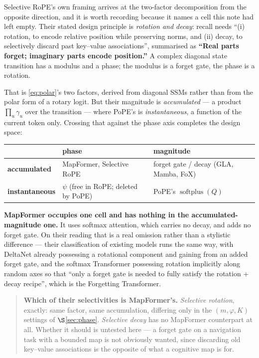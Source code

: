 \documentclass[11pt]{article}
\DeclareMathOperator{\softplus}{softplus}
\begin{document}
Selective RoPE's own framing arrives at the two-factor decomposition from the
opposite direction, and it is worth recording because it names a cell this note
had left empty. Their stated design principle is \emph{rotation and decay}:
recall needs ``(i) rotation, to encode relative position while preserving norms,
and (ii) decay, to selectively discard past key--value associations'', summarised
as \textbf{``Real parts forget; imaginary parts encode position.''} A complex
diagonal state transition has a modulus and a phase; the modulus is a forget
gate, the phase is a rotation.

That is \eqref{eq:polar}'s two factors, derived from diagonal SSMs rather than
from the polar form of a rotary logit. But their magnitude is \emph{accumulated}
--- a product $\prod_{u}\gamma_u$ over the transition --- where PoPE's is
\emph{instantaneous}, a function of the current token only. Crossing that against
the phase axis completes the design space:

\begin{center}\small
\begin{tabular}{lll}
\toprule
 & \textbf{phase} & \textbf{magnitude} \\
\midrule
\textbf{accumulated} & MapFormer, Selective RoPE & forget gate / decay (GLA, Mamba, FoX) \\
\textbf{instantaneous} & $\psi$ (free in RoPE; deleted by PoPE) & PoPE's $\softplus(Q)$ \\
\bottomrule
\end{tabular}
\end{center}

\noindent \textbf{MapFormer occupies one cell and has nothing in the
accumulated-magnitude one.} It uses softmax attention, which carries no decay,
and adds no forget gate. On their reading that is a real omission rather than a
stylistic difference --- their classification of existing models runs the same
way, with DeltaNet already possessing a rotational component and gaining from an
added forget gate, and the softmax Transformer possessing rotation implicitly
along random axes so that ``only a forget gate is needed to fully satisfy the
rotation + decay recipe'', which is the Forgetting Transformer.

\begin{quote}\small
\textbf{Which of their selectivities is MapFormer's.} \emph{Selective rotation},
exactly: same factor, same accumulation, differing only in the $(m,\varphi,K)$
settings of $\S$\ref{sec:phase}. \emph{Selective decay} has no MapFormer
counterpart at all. Whether it should is untested here --- a forget gate on a
navigation task with a bounded map is not obviously wanted, since discarding old
key--value associations is the opposite of what a cognitive map is for.
\end{quote}
\end{document}
